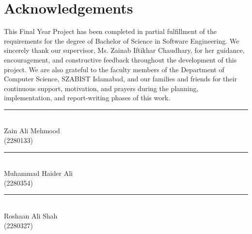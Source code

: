 \newpage
\thispagestyle{empty}

\chapter*{\centering Acknowledgements}
\par\bigskip
This Final Year Project has been completed in partial fulfillment of the requirements for the degree of Bachelor of Science in Software Engineering. We sincerely thank our supervisor, Ms. Zainab Iftikhar Chaudhary, for her guidance, encouragement, and constructive feedback throughout the development of this project. We are also grateful to the faculty members of the Department of Computer Science, SZABIST Islamabad, and our families and friends for their continuous support, motivation, and prayers during the planning, implementation, and report-writing phases of this work.

\vspace{2cm}

\noindent
\begin{minipage}{0.45\textwidth}
\centering
\rule{6cm}{0.4pt}\\[4pt]
Zain Ali Mehmood\\
(2280133)
\end{minipage}
\hfill
\begin{minipage}{0.45\textwidth}
\centering
\rule{6cm}{0.4pt}\\[4pt]
Muhammad Haider Ali\\
(2280354)
\end{minipage}

\vspace{1.8cm}

\begin{center}
\begin{minipage}{0.45\textwidth}
\centering
\rule{6cm}{0.4pt}\\[4pt]
Roshaan Ali Shah\\
(2280327)
\end{minipage}
\end{center}
